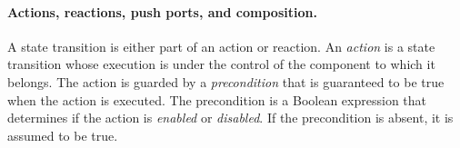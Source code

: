 
\paragraph{Actions, reactions, push ports, and composition.}
A state transition is either part of an action or reaction.
An \emph{action} is a state transition whose execution is under the control of the component to which it belongs.
The action is guarded by a \emph{precondition} that is guaranteed to be true when the action is executed.
The precondition is a Boolean expression that determines if the action is \emph{enabled} or \emph{disabled}.
If the precondition is absent, it is assumed to be true.

